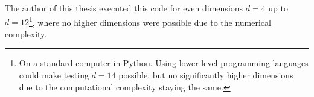 The author of this thesis executed this code for even dimensions $d=4$ up to $d=12$\footnote{On a standard computer in Python. Using lower-level programming languages could make testing $d=14$ possible, but no significantly higher dimensions due to the computational complexity staying the same.}, where no higher dimensions were possible due to the numerical complexity.

